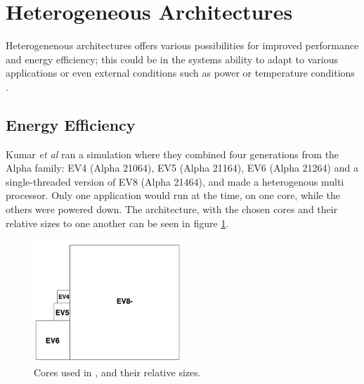 
\section{Heterogeneous Architectures}
\label{sec:heterogeneous}

Heterogenenous architectures offers various possibilities for improved performance and energy efficiency;
this could be in the systems ability to adapt to various applications or even external conditions such as
power or temperature conditions \cite{heterogeneous-ee, heterogeneous-perf, heterogeneous-arch}.


\subsection{Energy Efficiency}
\label{subsec:rw_ee} 
Kumar \textit{et al}\cite{heterogeneous-ee} ran a simulation where they combined four generations from the Alpha family: EV4 (Alpha 21064), EV5 (Alpha 21164), EV6 (Alpha 21264) and a single-threaded version of EV8 (Alpha 21464), and made a heterogenous multi processor.
Only one application would run at the time, on one core, while the others were powered down.
The architecture, with the chosen cores and their relative sizes to one another can be seen in figure
\ref{fig:Kumar1}.

\begin{figure}[htb]
    \centering
    \includegraphics[width=0.5\textwidth]{Figures/Heterogeneous/Kumar1}
    \caption{Cores used in \cite{heterogeneous-ee}, and their relative sizes.}
    \label{fig:Kumar1}
\end{figure}

